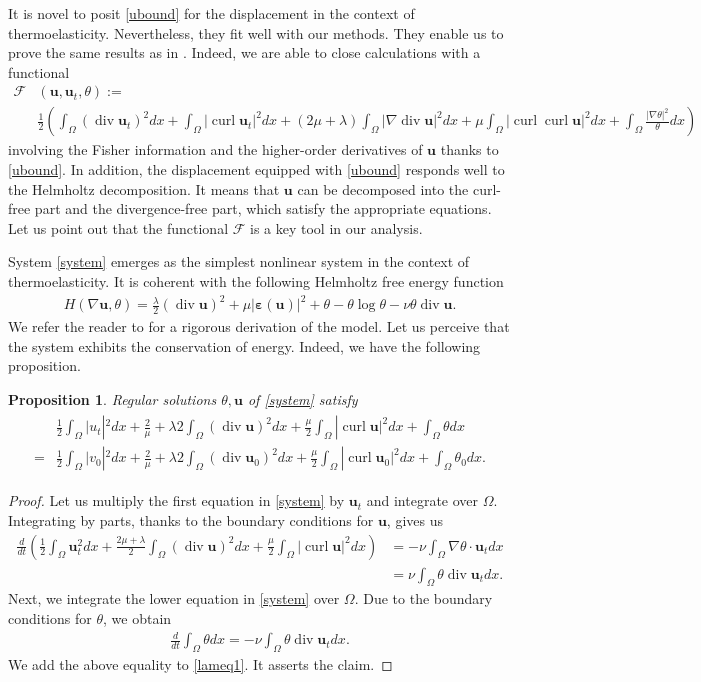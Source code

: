 \documentclass[11pt]{article}
\numberwithin{equation}{section}
\theoremstyle{plain}
\newtheorem{prop}[defi]{Proposition}
\newcommand\bb[1]{\mathbf{#1}}
\newcommand{\io}{\int_{\Omega}}
\newcommand{\ul}{\frac{1}{2}}
\newcommand{\ddt}{\frac{d}{dt}}
\renewcommand{\div}{\operatorname{div}}
\DeclareMathOperator{\curl}{curl}
\newcommand{\F}{\mathcal{F}}
\let \epsilon\varepsilon
\newcommand{\wspnd}{2\mu+\lambda}
\newcommand{\bu}{\bb{u}}
\newcommand{\bs}[1]{\boldsymbol{#1}}
\begin{document}
It is novel to posit \eqref{ubound} for the displacement in the context of thermoelasticity. Nevertheless, they fit well with our methods. They enable us to prove the same results as in \cite{Biest}. Indeed, we are able to close calculations with a functional
\begin{align*}
\F&(\bu,\bu_t,\theta):=\\
&\ul\left(\io (\div \bu_t)^2dx+\io |\curl \bu_t|^2dx+(\wspnd)\io|\nabla\div \bu|^2dx+\mu\io|\curl\curl\bu|^2dx+\io\frac{|\nabla\theta|^2}{\theta}dx\right)
\end{align*}  
involving the Fisher information and the higher-order derivatives of $\bu$  thanks to \eqref{ubound}. In addition, the displacement equipped with \eqref{ubound} responds well to the Helmholtz decomposition. It means that $\bu$ can be decomposed into the curl-free part and the divergence-free part, which satisfy the appropriate equations. Let us point out that the functional $\F$ is a key tool in our analysis.

System \eqref{system} emerges as the simplest nonlinear system in the context of thermoelasticity. It is coherent with the following Helmholtz free energy function
\begin{align*}
H(\nabla\bu,\theta)=\frac\lambda2(\div\bu)^2+\mu|\bs\epsilon(\bu)|^2+\theta-\theta\log\theta-\nu\theta\div\bu.
\end{align*}
We refer the reader to \cite{Rackebook, CMT, Slem} for a rigorous derivation of the model. Let us perceive that the system exhibits the conservation of energy. Indeed, we have the following proposition.
\begin{prop}\label{energy_cons}
Regular solutions $\theta, \bb u$ of \eqref{system} satisfy
\begin{align}\label{balance}
\begin{split}
&\ul\io \bb |u_t|^2dx+\frac\wspnd2\io (\div\bb u)^2dx+\frac\mu2\io|\curl \bb u|^2dx+\io\theta dx\\
=&\ul\io \bb |v_0|^2dx+\frac\wspnd2\io (\div\bb u_0)^2dx+\frac\mu2\io|\curl \bb u_0|^2dx+\io\theta_0 dx.
\end{split}
\end{align}
\end{prop}
\begin{proof}
Let us multiply the first equation in \eqref{system} by $\bb u_t$ and integrate over $\Omega$. Integrating by parts, thanks to the boundary conditions for $\bu$, gives us
\begin{align}\label{lameq1}
\ddt\left(\ul\io \bb{u}_t^2dx+\frac{2\mu+\lambda}2\io (\div \bb{u})^2dx+\frac\mu2\io|\curl \bb u|^2dx\right)&= -\nu\io\nabla\theta\cdot\bb u_tdx\nonumber\\
&=\nu\io\theta\div\bb u_tdx.
\end{align}
Next, we integrate the lower equation in \eqref{system} over $\Omega$. Due to the boundary conditions for $\theta$, we obtain
\begin{align*}
\ddt\io\theta dx=-\nu\io\theta\div\bb u_tdx.
\end{align*}
We add the above equality to \eqref{lameq1}. It asserts the claim.
\end{proof}
\end{document}
